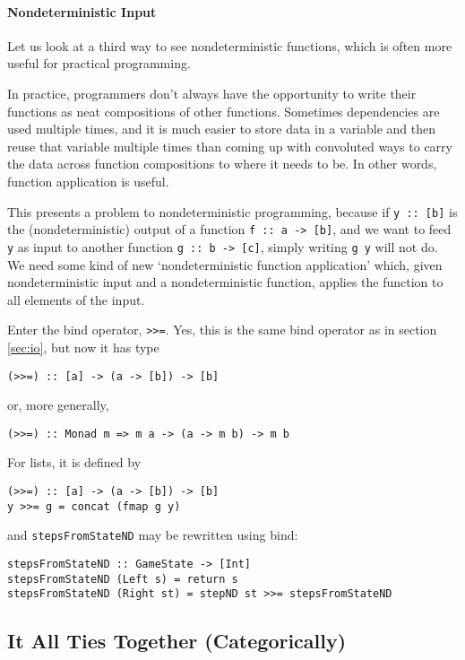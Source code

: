 \documentclass[11pt]{article}
\theoremstyle{nonumberplain}
\newcommand*\lsin{\lstinline}
\begin{document}
\paragraph{Nondeterministic Input}

Let us look at a third way to see nondeterministic functions, which is often more useful for practical programming.

In practice, programmers don't always have the opportunity to write their functions as neat compositions of other functions. Sometimes dependencies are used multiple times, and it is much easier to store data in a variable and then reuse that variable multiple times than coming up with convoluted ways to carry the data across function compositions to where it needs to be. In other words, function application is useful.

This presents a problem to nondeterministic programming, because if \lsin|y :: [b]| is the (nondeterministic) output of a function \lsin|f :: a -> [b]|, and we want to feed \lsin|y| as input to another function \lsin|g :: b -> [c]|, simply writing \lsin|g y| will not do. We need some kind of new `nondeterministic function application' which, given nondeterministic input and a nondeterministic function, applies the function to all elements of the input.

Enter the bind operator, \lsin|>>=|. Yes, this is the same bind operator as in section \ref{sec:io}, but now it has type
\begin{lstlisting}
(>>=) :: [a] -> (a -> [b]) -> [b]
\end{lstlisting}
or, more generally,
\begin{lstlisting}
(>>=) :: Monad m => m a -> (a -> m b) -> m b
\end{lstlisting}

For lists, it is defined by
\begin{lstlisting}
(>>=) :: [a] -> (a -> [b]) -> [b]
y >>= g = concat (fmap g y)
\end{lstlisting}
and \lsin|stepsFromStateND| may be rewritten using bind:
\begin{lstlisting}
stepsFromStateND :: GameState -> [Int]
stepsFromStateND (Left s) = return s
stepsFromStateND (Right st) = stepND st >>= stepsFromStateND
\end{lstlisting}

\subsection{It All Ties Together (Categorically)}
\end{document}

